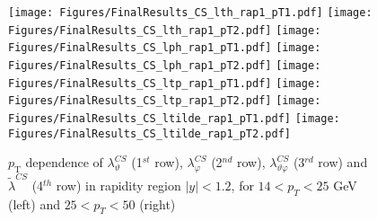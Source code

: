 \documentclass[12pt]{article}
\newcommand{\pT}{p_\mathrm{T}}
\newcommand{\absy}{\left |  y \right |}
\newcommand{\lamthCS}{\lambda^{\scriptscriptstyle CS}_\vartheta}
\newcommand{\lamphCS}{\lambda^{\scriptscriptstyle CS}_\varphi}
\newcommand{\lamthphCS}{\lambda^{\scriptscriptstyle CS}_{\vartheta \varphi}}
\newcommand{\lamtildeCS}{\tilde{\lambda}^{\scriptscriptstyle CS}}
\begin{document}
\begin{figure}[htbp]
\centering
\texttt{[image: Figures/FinalResults\_CS\_lth\_rap1\_pT1.pdf]}
\texttt{[image: Figures/FinalResults\_CS\_lth\_rap1\_pT2.pdf]}
\texttt{[image: Figures/FinalResults\_CS\_lph\_rap1\_pT1.pdf]}
\texttt{[image: Figures/FinalResults\_CS\_lph\_rap1\_pT2.pdf]}
\texttt{[image: Figures/FinalResults\_CS\_ltp\_rap1\_pT1.pdf]}
\texttt{[image: Figures/FinalResults\_CS\_ltp\_rap1\_pT2.pdf]}
\texttt{[image: Figures/FinalResults\_CS\_ltilde\_rap1\_pT1.pdf]}
\texttt{[image: Figures/FinalResults\_CS\_ltilde\_rap1\_pT2.pdf]}
\caption{$\pT$ dependence of $\lamthCS$
(1$^{st}$ row), $\lamphCS$ (2$^{nd}$ row), $\lamthphCS$ (3$^{rd}$ row) and 
$\lamtildeCS$ (4$^{th}$ row) in rapidity region $\absy<1.2$, for $14 < p_{T} < 25$ GeV (left) and $25 < p_{T} < 50$ (right)}
\end{figure}
\clearpage
\end{document}
